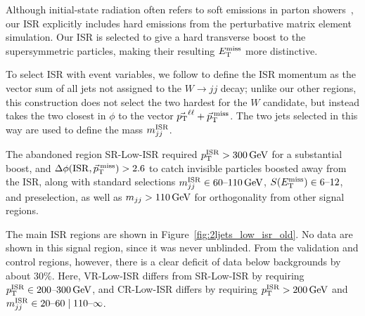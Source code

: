 Although initial-state radiation often refers to soft emissions in
parton showers~\cite{corcella2000initial, bewick2022initial},
our ISR explicitly includes hard emissions from the perturbative matrix element
simulation.
Our ISR is selected to give a hard transverse boost to the supersymmetric
particles, making their resulting $\met$ more distinctive.

To select ISR with event variables, we follow \cite{atlas_23l_SUSY_2016_24}
to define the ISR momentum as the vector sum of all jets not assigned to the
$W\to jj$ decay;
unlike our other regions, this construction does not select the two hardest for
the $W$ candidate, but instead takes the two closest in $\phi$ to the
vector $\vec \pt^{\ell\ell} + \ptmiss$.
The two jets selected in this way are used to define the mass $\mwisr$.

The abandoned region SR-Low-ISR required $\ptisr > 300\,\eV[G]$ for a
substantial boost, and $\dphiisrmet > 2.6$ to catch invisible particles boosted
away from the ISR,
along with standard selections $\mwisr \in 60\textrm{--}110\,\eV[G]$,
$\metsig \in 6\textrm{--}12$, and preselection, as well as $\mjj > 110\,\eV[G]$
for orthogonality from other signal regions.

The main ISR regions are shown in Figure~\ref{fig:2ljets_low_isr_old}.
No data are shown in this signal region, since it was never unblinded.
From the validation and control regions, however, there is a clear deficit
of data below backgrounds by about $30\%$.
Here, VR-Low-ISR differs from SR-Low-ISR by requiring
$\ptisr \in 200\textit{--}300\,\eV[G]$, and CR-Low-ISR differs by requiring
$\ptisr > 200\,\eV[G]$ and
$\mwisr \in 20\textrm{--}60 \mid 110\textrm{--}\infty$.

